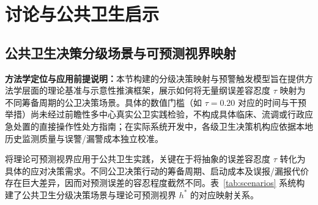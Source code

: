 \documentclass[11pt,a4paper]{article}
\theoremstyle{plain}
\theoremstyle{definition}
\begin{document}
\section{讨论与公共卫生启示}

\subsection{公共卫生决策分级场景与可预测视界映射}
\noindent\textbf{方法学定位与应用前提说明：}本节构建的分级决策映射与预警触发模型旨在提供方法学层面的理论基准与示意性推演框架，展示如何将无量纲误差容忍度 $\tau$ 映射为不同筹备周期的公卫决策场景。具体的数值门槛（如 $\tau=0.20$ 对应的时间与干预举措）尚未经过前瞻性多中心真实公卫实践检验，不构成具体临床、流调或行政应急处置的直接操作性处方指南；在实际系统开发中，各级卫生决策机构应依据本地历史监测质量与误警/漏警成本独立校准。

将理论可预测视界应用于公共卫生实践，关键在于将抽象的误差容忍度 $\tau$ 转化为具体的应对决策需求。不同公卫决策行动的筹备周期、启动成本及误报/漏报代价存在巨大差异，因而对预测误差的容忍程度截然不同。表~\ref{tab:scenarios} 系统构建了公共卫生分级决策场景与理论可预测视界 $h^*$ 的对应映射关系。
\end{document}
